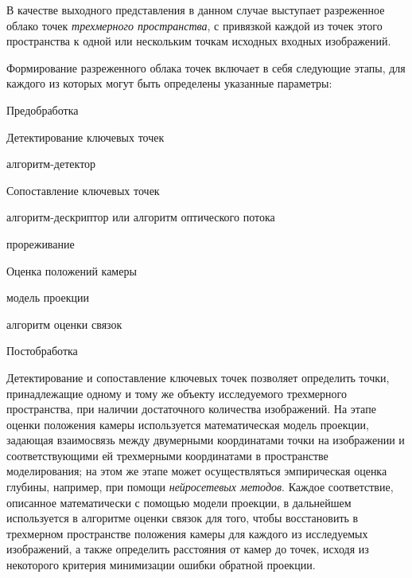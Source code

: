 В качестве выходного представления в данном случае выступает разреженное облако точек \textit{трехмерного пространства}, с привязкой каждой из точек этого пространства к одной или нескольким точкам исходных входных изображений.

Формирование разреженного облака точек включает в себя следующие этапы, для каждого из которых могут быть определены указанные параметры:
\begin{textitemize}
    \item Предобработка
    \item Детектирование ключевых точек
    \begin{textitemize}
        \item алгоритм-детектор
    \end{textitemize}
    \item Сопоставление ключевых точек
    \begin{textitemize}
        \item алгоритм-дескриптор или алгоритм оптического потока
        \item прореживание
    \end{textitemize}
    \item Оценка положений камеры
    \begin{textitemize}
        \item  модель проекции
        \item алгоритм оценки связок
    \end{textitemize}
    \item Постобработка
\end{textitemize}

Детектирование и сопоставление ключевых точек позволяет определить точки, принадлежащие одному и тому же объекту исследуемого трехмерного пространства, при наличии достаточного количества изображений. На этапе оценки положения камеры используется математическая модель проекции, задающая взаимосвязь между двумерными координатами точки на изображении и соответствующими ей трехмерными координатами в пространстве моделирования; на этом же этапе может осуществляться эмпирическая оценка глубины, например, при помощи \textit{нейросетевых методов}. Каждое соответствие, описанное математически с помощью модели проекции, в дальнейшем используется в алгоритме оценки связок для того, чтобы восстановить в трехмерном пространстве положения камеры для каждого из исследуемых изображений, а также определить расстояния от камер до точек, исходя из некоторого критерия минимизации ошибки обратной проекции.

